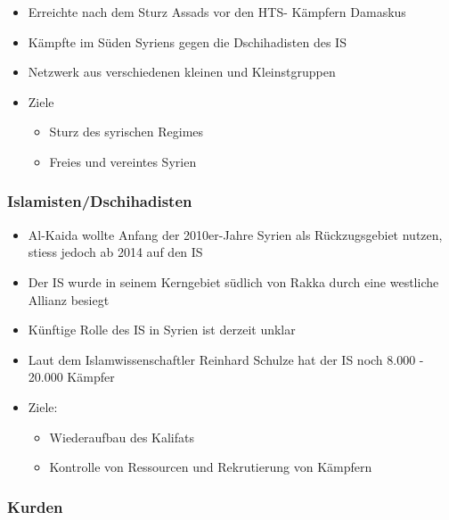{}\documentclass[a4paper]{article}
\providecommand{\tightlist}{\setlength{\itemsep}{1mm}\setlength{\parskip}{1mm}}
\begin{document}
\begin{itemize}
	\tightlist
	\item
	      Erreichte nach dem Sturz Assads vor den HTS- Kämpfern Damaskus
	\item
	      Kämpfte im Süden Syriens gegen die Dschihadisten des IS
	\item
	      Netzwerk aus verschiedenen kleinen und Kleinstgruppen
	\item
	      Ziele

	      \begin{itemize}
		      \tightlist
		      \item
		            Sturz des syrischen Regimes
		      \item
		            Freies und vereintes Syrien
	      \end{itemize}
\end{itemize}

\subsubsection{Islamisten/Dschihadisten}\label{islamistendschihadisten}

\begin{itemize}
	\tightlist
	\item
	      Al-Kaida wollte Anfang der 2010er-Jahre Syrien als Rückzugsgebiet
	      nutzen, stiess jedoch ab 2014 auf den IS
	\item
	      Der IS wurde in seinem Kerngebiet südlich von Rakka durch eine
	      westliche Allianz besiegt
	\item
	      Künftige Rolle des IS in Syrien ist derzeit unklar
	\item
	      Laut dem Islamwissenschaftler Reinhard Schulze hat der IS noch 8.000 -
	      20.000 Kämpfer
	\item
	      Ziele:

	      \begin{itemize}
		      \tightlist
		      \item
		            Wiederaufbau des Kalifats
		      \item
		            Kontrolle von Ressourcen und Rekrutierung von Kämpfern
	      \end{itemize}
\end{itemize}

\subsubsection{Kurden}\label{kurden}
\end{document}
